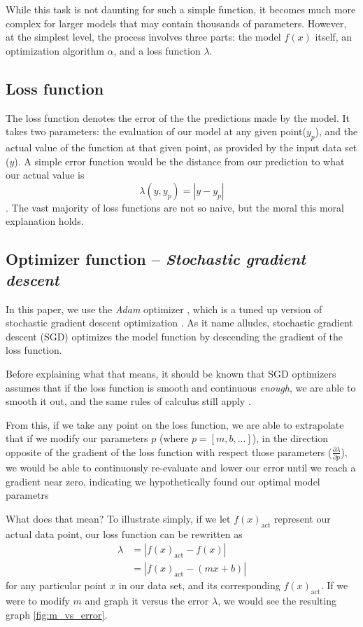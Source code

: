 \documentclass[titlepage,letterpaper]{article}
\begin{document}
While this task is not daunting for such a simple function, it becomes much more complex for larger models that may contain thousands of parameters. However, at the simplest level, the process involves three parts: the model $f(x)$ itself, an optimization algorithm $\alpha$,  and a loss function $\lambda$.


\subsection{Loss function}

The loss function denotes the error of the the predictions made by the model. It takes two parameters: the evaluation of our model at any given point($y_p$), and the actual value of the function at that given point, as provided by the input data set ($y$). A simple error function would be the distance from our prediction to what our actual value is
\[\lambda(y,y_p) =  |y - y_p| \]. The vast majority of loss functions are not so naive, but the moral this moral explanation holds.


\subsection{Optimizer function -- \textit{Stochastic gradient descent}}

In this paper, we use the \textit{Adam} optimizer \cite{adam}, which is a tuned up version of stochastic gradient descent optimization \cite{adam}. As it name alludes, stochastic gradient descent (SGD) optimizes the model function by descending the gradient of the loss function. 

Before explaining what that means, it should be known that SGD optimizers assumes  that if the loss function is smooth and continuous \textit{enough}, we are able to smooth it out, and the same rules of calculus still apply \cite{adam}.

From this, if we take any point on the loss function, we are able to extrapolate that if we modify our parameters \(p\) (where $p = [m, b,...]$), in the direction opposite of the gradient of the loss function with respect those parameters ($\frac{\partial\lambda}{\partial p}$), we would be able to continuously re-evaluate and lower our error until we reach a gradient near zero, indicating we hypothetically found our optimal model parametrs

What does that mean? To illustrate simply, if we let $f(x)_{\text{act}}$ represent our actual data point, our loss function can be rewritten as 
\begin{align}
\lambda &=  |f(x)_{\text{act}} - f(x)| \nonumber\\
&= | f(x)_{\text{act}} -  (mx + b)\label{eq1}|
\end{align}
for any particular point $x$ in our data set, and its corresponding $f(x)_{\text{act}}$. If we were to modify  $m$  and graph it versus the error $\lambda$, we would see the resulting graph \cref{fig:m_vs_error}. 
\end{document}

